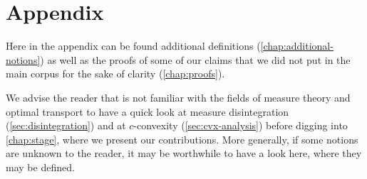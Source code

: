 \appendix
\chapter*{Appendix}
\adjustmtc[2]

Here in the appendix can be found additional definitions (\cref{chap:additional-notions}) as well as the proofs of some of our claims that we did not put in the main corpus for the sake of clarity (\cref{chap:proofs}).

We advise the reader that is not familiar with the fields of measure theory and optimal transport to have a quick look at measure disintegration (\cref{sec:disintegration}) and at $c$-convexity (\cref{sec:cvx-analysis}) before digging into \cref{chap:stage}, where we present our contributions. More generally, if some notions are unknown to the reader, it may be worthwhile to have a look here, where they may be defined.

\label{chap:proofs}


